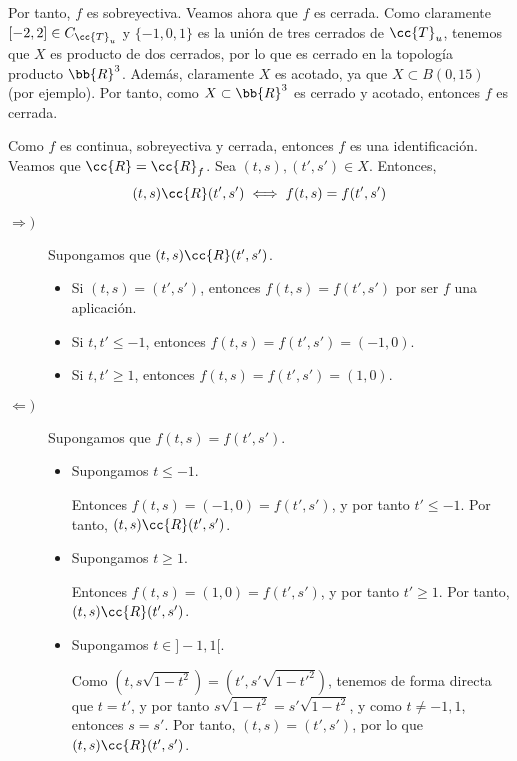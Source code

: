 \documentclass[12pt]{article}
\newcommand{\T}[0]{\cc{T}}
\begin{document}
\begin{ejercicio}[3 puntos]
\begin{enumerate}
            Por tanto, $f$ es sobreyectiva. Veamos ahora que $f$ es cerrada. Como claramente $[-2,2]\in C_{\T_u}$ y $\{-1,0,1\}$ es la unión de tres cerrados de $\T_u$, tenemos que $X$
            es producto de dos cerrados, por lo que es cerrado en la topología producto $\bb{R}^3$. Además, claramente $X$ es acotado, ya que $X\subset B(0, 15)$ (por ejemplo).
            Por tanto, como $X\subset \bb{R}^3$ es cerrado y acotado, entonces $f$ es cerrada.
            
            Como $f$ es continua, sobreyectiva y cerrada, entonces $f$ es una identificación. Veamos que $\cc{R}=\cc{R}_f$. Sea $(t,s), (t',s')\in X$. Entonces,
            \begin{equation*}
                (t,s)\cc{R} (t',s') \iff f(t,s)=f(t',s')
            \end{equation*}
            \begin{description}
                \item[$\Longrightarrow)$] Supongamos que $(t,s)\cc{R} (t',s')$.
                \begin{itemize}
                    \item Si $(t,s)=(t',s')$, entonces $f(t,s)=f(t',s')$ por ser $f$ una aplicación.
                    \item Si $t,t'\leq -1$, entonces $f(t,s)=f(t',s')=(-1,0)$.
                    \item Si $t,t'\geq 1$, entonces $f(t,s)=f(t',s')=(1,0)$.
                \end{itemize}

                \item[$\Longleftarrow)$] Supongamos que $f(t,s)=f(t',s')$.
                \begin{itemize}
                    \item Supongamos $t\leq -1$.
                    
                    Entonces $f(t,s)=(-1,0)=f(t',s')$, y por tanto $t'\leq -1$. Por tanto, $(t,s)\cc{R}(t',s')$.

                    \item Supongamos $t\geq 1$.
                    
                    Entonces $f(t,s)=(1,0)=f(t',s')$, y por tanto $t'\geq 1$. Por tanto, $(t,s)\cc{R}(t',s')$.

                    \item Supongamos $t\in ]-1,1[$.
                    
                    Como $(t,s\sqrt{1-t^2})=(t',s'\sqrt{1-{t'}^2})$, tenemos de forma directa que $t=t'$, y por tanto $s\sqrt{1-t^2}=s'\sqrt{1-t^2}$,
                    y como $t\neq -1,1$, entonces $s=s'$. Por tanto, $(t,s)=(t',s')$, por lo que $(t,s)\cc{R}(t',s')$.
                \end{itemize}
            \end{description}


\end{enumerate}
\end{ejercicio}
\end{document}

